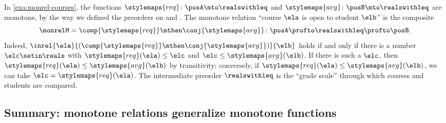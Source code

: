 \begin{example}
    In \cref{exa:monrel-courses}, the functions $\stylemaps{req} \colon \posA \mto \realswithleq$ and $\stylemaps{avg} \colon \posB \mto \realswithleq$ are monotone, by the way we defined the preorders on \posA and \posB.
    The monotone relation ``course $\ela$ is open to student $\elb$'' is the composite
    \begin{equation}
        \monrelM = \comp{\stylemaps{req}} \mthen \conj{\stylemaps{avg}} \colon \posA \profto \realswithleq \profto \posB.
    \end{equation}
    Indeed, $\inrel{\ela}{(\comp{\stylemaps{req}} \mthen \conj{\stylemaps{avg}})}{\elb}$ holds if and only if there is a number $\elc \setin \reals$ with $\stylemaps{req}(\ela) \leq \elc$ and $\elc \leq \stylemaps{avg}(\elb)$.
    If there is such a $\elc$, then $\stylemaps{req}(\ela) \leq \stylemaps{avg}(\elb)$ by transitivity; conversely, if $\stylemaps{req}(\ela) \leq \stylemaps{avg}(\elb)$, we can take $\elc = \stylemaps{req}(\ela)$.
    The intermediate preorder $\realswithleq$ is the ``grade scale'' through which courses and students are compared.
\end{example}

\subsection{Summary: monotone relations generalize monotone functions}

